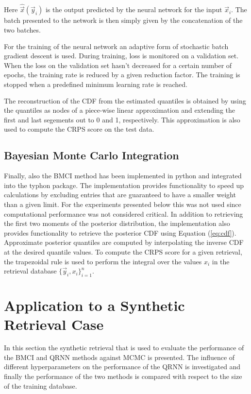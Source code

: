\documentclass[journal abbreviation, manuscript]{copernicus}
\begin{document}
    Here $\hat{\vec{x}}(\vec{y}_i)$ is the output predicted by the neural
    network for the input $\vec{x}_i$. The batch presented to the network is
    then simply given by the concatenation of the two batches.

   For the training of the neural network an adaptive form of stochastic batch
   gradient descent is used. During training, loss is monitored on a validation
   set. When the loss on the validation set hasn't decreased for a certain number
   of epochs, the training rate is reduced by a given reduction factor. The
   training is stopped when a predefined minimum learning rate is reached.

   The reconstruction of the CDF from the estimated quantiles is obtained
   by using the quantiles as nodes of a piece-wise linear approximation and
   extending the first and last segements out to 0 and 1, respectively.
   This approximation is also used to compute the CRPS score on the test
   data.

\subsection{Bayesian Monte Carlo Integration}

  Finally, also the BMCI method has been implemented in python and integrated
  into the typhon package. The implementation provides functionality to speed up
  calculations by excluding entries that are guaranteed to have a smaller weight
  than a given limit. For the experiments presented below this was not used
  since computational performance was not considered critical. In addition to
  retrieving the first two moments of the posterior distribution, the
  implementation also provides functionality to retrieve the posterior CDF using
  Equation (\ref{eq:cdf}). Approximate posterior quantiles are computed by
  interpolating the inverse CDF at the desired quantile values. To compute the
  CRPS score for a given retrieval, the trapezoidal rule is used to perform the
  integral over the values $x_i$ in the retrieval database
  $\{\vec{y}_i, x_i\}_{i = 1}^n$.


\section{Application to a Synthetic Retrieval Case}
\label{sec:synthetic}

  In this section the synthetic retrieval that is used to evaluate the
  performance of the BMCI and QRNN methods against MCMC is presented. The
  influence of different hyperparameters on the performance of the QRNN is
  investigated and finally the performance of the two methods is compared with
  respect to the size of the training database.
\end{document}
